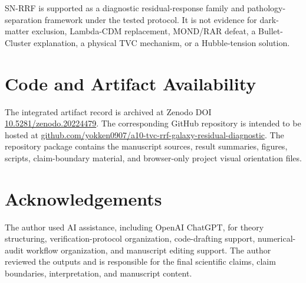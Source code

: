 \documentclass[11pt,a4paper]{article}
\begin{document}
SN-RRF is supported as a diagnostic residual-response family and pathology-separation framework under the tested protocol. It is not evidence for dark-matter exclusion, Lambda-CDM replacement, MOND/RAR defeat, a Bullet-Cluster explanation, a physical TVC mechanism, or a Hubble-tension solution.

\section*{Code and Artifact Availability}
The integrated artifact record is archived at Zenodo DOI \href{https://doi.org/10.5281/zenodo.20224479}{10.5281/zenodo.20224479}. The corresponding GitHub repository is intended to be hosted at \href{https://github.com/yokken0907/a10-tvc-rrf-galaxy-residual-diagnostic}{github.com/yokken0907/a10-tvc-rrf-galaxy-residual-diagnostic}. The repository package contains the manuscript sources, result summaries, figures, scripts, claim-boundary material, and browser-only project visual orientation files.

\section*{Acknowledgements}
The author used AI assistance, including OpenAI ChatGPT, for theory structuring, verification-protocol organization, code-drafting support, numerical-audit workflow organization, and manuscript editing support. The author reviewed the outputs and is responsible for the final scientific claims, claim boundaries, interpretation, and manuscript content.
\end{document}
